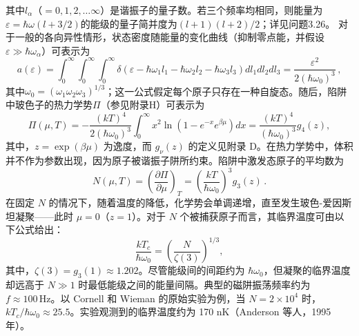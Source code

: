 其中\(l_{\alpha}\)（\(=0,1,2,\ldots\infty\)）是谐振子的量子数。若三个频率均相同，则能量为\(\varepsilon=\hbar\omega(l+3/2)\)的能级的量子简并度为\((l+1)(l+2)/2\)；详见问题3.26。
对于一般的各向异性情形，状态密度随能量的变化曲线（抑制零点能，并假设\(\varepsilon \gg \hbar\omega_{\alpha}\)）可表示为
\begin{equation}\tag{7.1.54}\label{eq:7.1.54}
a ( \varepsilon ) = \int _ { 0 } ^{\infty}     \int _ { 0 } ^{\infty}     \int _ { 0 } ^{\infty}     \delta \left( \varepsilon - \hbar \omega _ { 1 } l _ { 1 } - \hbar \omega _ { 2 } l _ { 2 } - \hbar \omega _ { 3 } l _ { 3 } \right) d l _ { 1 } d l _ { 2 } d l _ { 3 } = \frac { \varepsilon ^{2} } { 2 ( \hbar \omega _ { 0 } ) ^{3} } \, ,
\end{equation}
其中\(\omega_{0}=(\omega_{1}\omega_{2}\omega_{3})^{1/3}\)；这一公式假定每个原子只存在一种自旋态。随后，陷阱中玻色子的热力学势\(\Pi\)（参见附录H）可表示为
\begin{equation}\tag{7.1.55}\label{eq:7.1.55}
\Pi ( \mu , T ) = - \frac { \left( k T \right) ^{4} } { 2 \left( \hbar \omega _ { 0 } \right) ^{3} } \int _ { 0 } ^{\infty} x ^{2} \ln \left( 1 - e ^{- x} e ^{\beta \mu} \right) d x = \frac { \left( k T \right) ^{4} } { \left( \hbar \omega _ { 0 } \right) ^{3} } g _ { 4 } ( z ) ,
\end{equation}
其中，\(z = \exp(\beta\mu)\) 为逸度，而 \(g_{\nu}(z)\) 的定义见附录 D。在热力学势中，体积并不作为参数出现，因为原子被谐振子阱所约束。陷阱中激发态原子的平均数为
\begin{equation}\tag{7.1.56}\label{eq:7.1.56}
N ( \mu , T ) = \left( \frac { \partial \Pi } { \partial \mu } \right) _ { T } = \left( \frac { k T } { \hbar \omega _ { 0 } } \right) ^{3} g _ { 3 } ( z ) \, .
\end{equation}
在固定 \(N\) 的情况下，随着温度的降低，化学势会单调递增，直至发生玻色-爱因斯坦凝聚——此时 \(\mu = 0\)（\(z = 1\)）。对于 \(N\) 个被捕获原子而言，其临界温度可由以下公式给出：
\begin{equation}\tag{7.1.57}\label{eq:7.1.57}
\frac { k T _ { c } } { \hbar \omega _ { 0 } } = \left( \frac { N } { \zeta ( 3 ) } \right) ^{1 / 3} ,
\end{equation}
其中，\(\zeta(3) = g_{3}(1) \approx 1.202\)。尽管能级间的间距约为 \(\hbar\omega_{0}\)，但凝聚的临界温度却远高于 \(N \gg 1\) 时最低能级之间的能量间隔。典型的磁阱振荡频率约为 \(f \approx 100\,\text{Hz}\)。以 Cornell 和 Wieman 的原始实验为例，当 \(N = 2 \times 10^{4}\) 时，\(kT_{c}/\hbar\omega_{0} \approx 25.5\)。实验观测到的临界温度约为 170 nK（Anderson 等人，1995 年）。
